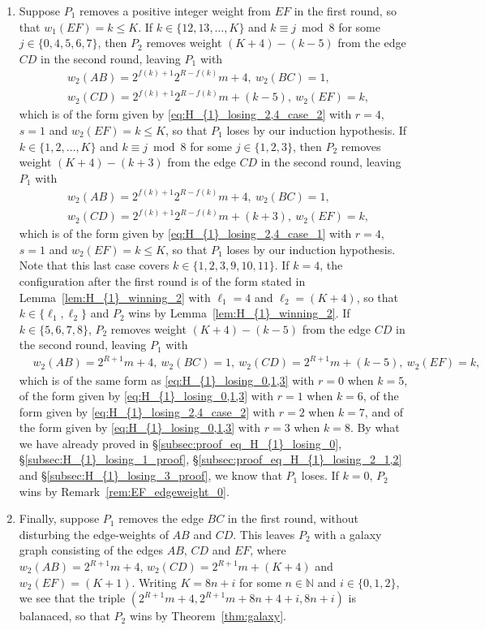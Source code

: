 \documentclass[11pt,reqno]{amsart}
\theoremstyle{definition}
\theoremstyle{definition}
\begin{document}
\begin{enumerate}
\item Suppose $P_{1}$ removes a positive integer weight from $EF$ in the first round, so that $w_{1}(EF)=k \leqslant K$. If $k \in \{12,13,\ldots,K\}$ and $k \equiv j \bmod 8$ for some $j \in \{0,4,5,6,7\}$, then $P_{2}$ removes weight $(K+4)-(k-5)$ from the edge $CD$ in the second round, leaving $P_{1}$ with
\begin{align}
{}&w_{2}(AB)=2^{f(k)+1}2^{R-f(k)}m+4,\ w_{2}(BC)=1,\nonumber\\
{}&w_{2}(CD)=2^{f(k)+1}2^{R-f(k)}m+(k-5),\ w_{2}(EF)=k,\nonumber
\end{align}
which is of the form given by \eqref{eq:H_{1}_losing_2,4_case_2} with $r=4$, $s=1$ and $w_{2}(EF)=k\leqslant K$, so that $P_{1}$ loses by our induction hypothesis. If $k \in \{1,2,\ldots,K\}$ and $k \equiv j \bmod 8$ for some $j \in \{1,2,3\}$, then $P_{2}$ removes weight $(K+4)-(k+3)$ from the edge $CD$ in the second round, leaving $P_{1}$ with
\begin{align}
{}&w_{2}(AB)=2^{f(k)+1}2^{R-f(k)}m+4,\ w_{2}(BC)=1,\nonumber\\
{}&w_{2}(CD)=2^{f(k)+1}2^{R-f(k)}m+(k+3),\ w_{2}(EF)=k,\nonumber
\end{align}
which is of the form given by \eqref{eq:H_{1}_losing_2,4_case_1} with $r=4$, $s=1$ and $w_{2}(EF)=k\leqslant K$, so that $P_{1}$ loses by our induction hypothesis. Note that this last case covers $k \in \{1,2,3,9,10,11\}$. If $k=4$, the configuration after the first round is of the form stated in Lemma~\ref{lem:H_{1}_winning_2} with $\ell_{1}=4$ and $\ell_{2}=(K+4)$, so that $k \in \{\ell_{1},\ell_{2}\}$ and $P_{2}$ wins by Lemma~\ref{lem:H_{1}_winning_2}. If $k \in \{5,6,7,8\}$, $P_{2}$ removes weight $(K+4)-(k-5)$ from the edge $CD$ in the second round, leaving $P_{1}$ with
\begin{align}
{}&w_{2}(AB)=2^{R+1}m+4,\ w_{2}(BC)=1,\ w_{2}(CD)=2^{R+1}m+(k-5),\ w_{2}(EF)=k,\nonumber
\end{align}
which is of the same form as \eqref{eq:H_{1}_losing_0,1,3} with $r=0$ when $k=5$, of the form given by \eqref{eq:H_{1}_losing_0,1,3} with $r=1$ when $k=6$, of the form given by \eqref{eq:H_{1}_losing_2,4_case_2} with $r=2$ when $k=7$, and of the form given by \eqref{eq:H_{1}_losing_0,1,3} with $r=3$ when $k=8$. By what we have already proved in \S\ref{subsec:proof_eq_H_{1}_losing_0}, \S\ref{subsec:H_{1}_losing_1_proof}, \S\ref{subsec:proof_eq_H_{1}_losing_2_1,2} and \S\ref{subsec:H_{1}_losing_3_proof}, we know that $P_{1}$ loses. If $k=0$, $P_{2}$ wins by Remark~\ref{rem:EF_edgeweight_0}.

\item Finally, suppose $P_{1}$ removes the edge $BC$ in the first round, without disturbing the edge-weights of $AB$ and $CD$. This leaves $P_{2}$ with a galaxy graph consisting of the edges $AB$, $CD$ and $EF$, where $w_{2}(AB)=2^{R+1}m+4$, $w_{2}(CD)=2^{R+1}m+(K+4)$ and $w_{2}(EF)=(K+1)$. Writing $K=8n+i$ for some $n\in\mathbb{N}$ and $i\in\{0,1,2\}$, we see that the triple $\left(2^{R+1}m+4,2^{R+1}m+8n+4+i,8n+i\right)$ is balanaced, so that $P_{2}$ wins by Theorem~\ref{thm:galaxy}.
\end{enumerate}
\end{document}
